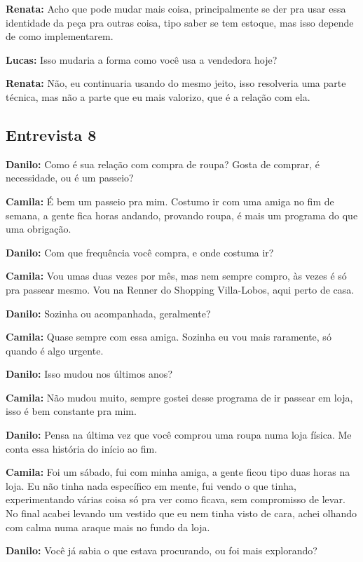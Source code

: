 \textbf{Renata:} Acho que pode mudar mais coisa, principalmente se der pra usar essa identidade da peça pra outras coisa, tipo saber se tem estoque, mas isso depende de como implementarem.

\textbf{Lucas:} Isso mudaria a forma como você usa a vendedora hoje?

\textbf{Renata:} Não, eu continuaria usando do mesmo jeito, isso resolveria uma parte técnica, mas não a parte que eu mais valorizo, que é a relação com ela.


\subsection*{Entrevista 8}

\textbf{Danilo:} Como é sua relação com compra de roupa? Gosta de comprar, é necessidade, ou é um passeio?

\textbf{Camila:} É bem um passeio pra mim. Costumo ir com uma amiga no fim de semana, a gente fica horas andando, provando roupa, é mais um programa do que uma obrigação.

\textbf{Danilo:} Com que frequência você compra, e onde costuma ir?

\textbf{Camila:} Vou umas duas vezes por mês, mas nem sempre compro, às vezes é só pra passear mesmo. Vou na Renner do Shopping Villa-Lobos, aqui perto de casa.

\textbf{Danilo:} Sozinha ou acompanhada, geralmente?

\textbf{Camila:} Quase sempre com essa amiga. Sozinha eu vou mais raramente, só quando é algo urgente.

\textbf{Danilo:} Isso mudou nos últimos anos?

\textbf{Camila:} Não mudou muito, sempre gostei desse programa de ir passear em loja, isso é bem constante pra mim.

\textbf{Danilo:} Pensa na última vez que você comprou uma roupa numa loja física. Me conta essa história do início ao fim.

\textbf{Camila:} Foi um sábado, fui com minha amiga, a gente ficou tipo duas horas na loja. Eu não tinha nada específico em mente, fui vendo o que tinha, experimentando várias coisa só pra ver como ficava, sem compromisso de levar. No final acabei levando um vestido que eu nem tinha visto de cara, achei olhando com calma numa araque mais no fundo da loja.

\textbf{Danilo:} Você já sabia o que estava procurando, ou foi mais explorando?

